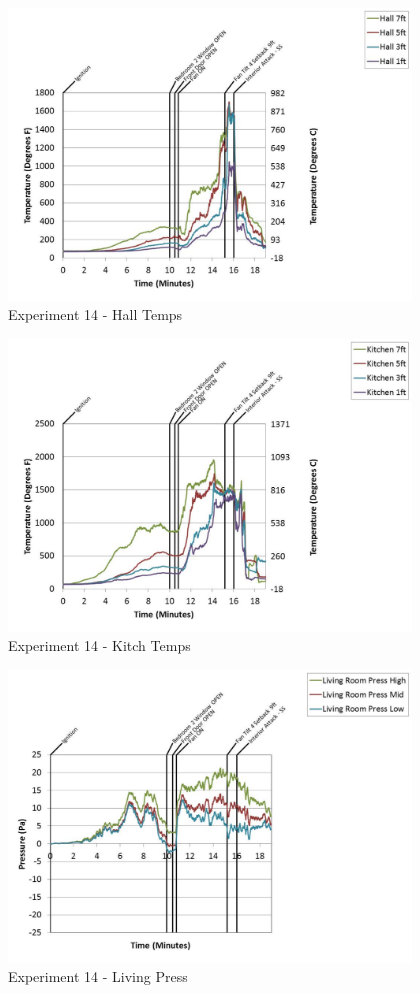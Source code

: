 \documentclass{article}
\begin{document}
\begin{appendices}
	\clearpage

	\begin{figure}[h!]
		\centering
		\includegraphics[height=3.05in]{0_Images/Results_Charts/Exp_14_Charts/HallTemps.pdf}
		\caption{Experiment 14 - Hall Temps}
	\end{figure}
 

	\begin{figure}[h!]
		\centering
		\includegraphics[height=3.05in]{0_Images/Results_Charts/Exp_14_Charts/KitchTemps.pdf}
		\caption{Experiment 14 - Kitch Temps}
	\end{figure}
 
	\clearpage

	\begin{figure}[h!]
		\centering
		\includegraphics[height=3.05in]{0_Images/Results_Charts/Exp_14_Charts/LivingPress.pdf}
		\caption{Experiment 14 - Living Press}
	\end{figure}
 


\end{appendices}
\end{document}

